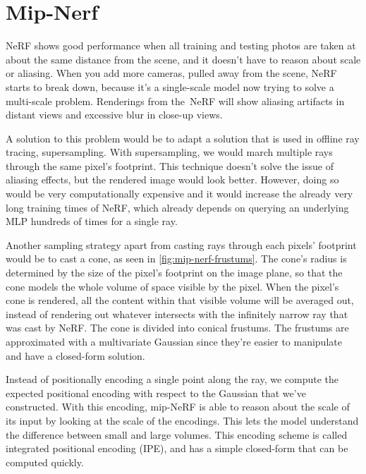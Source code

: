 





\section{Mip-Nerf} \label{sec:mipnerf}

NeRF shows good performance when all training and testing photos are taken at about the same distance from the scene, and it doesn't have to reason about scale or aliasing. When you add more cameras, pulled away from the scene, NeRF starts to break down, because it's a single-scale model now trying to solve a multi-scale problem. Renderings from the NeRF will show aliasing artifacts in distant views and excessive blur in close-up views.

A solution to this problem would be to adapt a solution that is used in offline ray tracing, supersampling. With supersampling, we would march multiple rays through the same pixel's footprint. This technique doesn't solve the issue of aliasing effects, but the rendered image would look better. However, doing so would be very computationally expensive and it would increase the already very long training times of NeRF, which already depends on querying an underlying MLP hundreds of times for a single ray.

Another sampling strategy apart from casting rays through each pixels' footprint would be to cast a cone, as seen in \autoref{fig:mip-nerf-frustums}. The cone's radius is determined by the size of the pixel's footprint on the image plane, so that the cone models the whole volume of space visible by the pixel. When the pixel's cone is rendered, all the content within that visible volume will be averaged out, instead of rendering out whatever intersects with the infinitely narrow ray that was cast by NeRF. The cone is divided into conical frustums. The frustums are approximated with a multivariate Gaussian since they're easier to manipulate and have a closed-form solution.



Instead of positionally encoding a single point along the ray, we compute the expected positional encoding with respect to the Gaussian that we've constructed. With this encoding, mip-NeRF is able to reason about the scale of its input by looking at the scale of the encodings. This lets the model understand the difference between small and large volumes. This encoding scheme is called integrated positional encoding (IPE), and has a simple closed-form that can be computed quickly.

